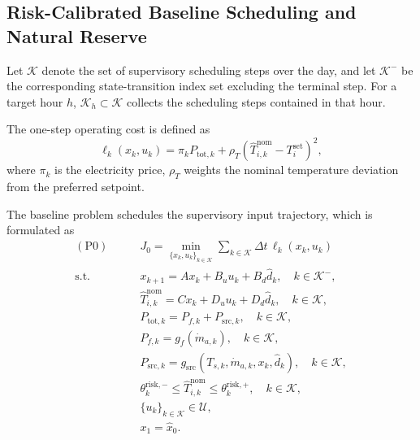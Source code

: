 \documentclass[journal]{IEEEtran}
\theoremstyle{remark}
\begin{document}
\subsection{Risk-Calibrated Baseline Scheduling and Natural Reserve}
\label{subsec:baseline_natural_reserve}

Let \(\mathcal{K}\) denote the set of supervisory scheduling steps over
the day, and let \(\mathcal{K}^{-}\) be the corresponding
state-transition index set excluding the terminal step. For a target
hour \(h\), \(\mathcal{K}_h\subset\mathcal{K}\) collects the scheduling
steps contained in that hour.

The one-step operating cost is defined as
\begin{equation}
	\ell_k(x_k,u_k)
	=
	\pi_k P_{\mathrm{tot},k}
	+
	\rho_T
	\left(
	\hat T_{i,k}^{\mathrm{nom}}-T_i^{\mathrm{set}}
	\right)^2 ,
	\label{eq:stage_cost}
\end{equation}
where \(\pi_k\) is the electricity price, \(\rho_T\) weights the nominal temperature deviation from the preferred setpoint.

The baseline problem schedules the supervisory input trajectory, which is formulated as
\begin{subequations}
	\label{prob:P0}
	\begin{align}
		(\mathrm{P0})\qquad
		&J_0=
		\min_{\{x_k,u_k\}_{k\in\mathcal{K}}}
		\sum_{k\in\mathcal{K}}
		\Delta t\,\ell_k(x_k,u_k)
		\label{eq:p0_obj}
		\\
		\mathrm{s.t.}\qquad
		&
		x_{k+1}
		=
		A x_k+B_u u_k+B_d\hat d_k,
		\quad k\in\mathcal{K}^{-},
		\label{eq:p0_dyn}
		\\
		&
		\hat T_{i,k}^{\mathrm{nom}}
		=
		C x_k+D_u u_k+D_d\hat d_k,
		\quad k\in\mathcal{K},
		\label{eq:p0_temp}
		\\
		&
		P_{\mathrm{tot},k}
		=
		P_{f,k}+P_{\mathrm{src},k},
		\quad k\in\mathcal{K},
		\label{eq:p0_total_power}
		\\
		&
		P_{f,k}
		=
		g_f(\dot m_{a,k}),
		\quad k\in\mathcal{K},
		\label{eq:p0_fan_power}
		\\
		&
		P_{\mathrm{src},k}
		=
		g_{\mathrm{src}}
		(T_{s,k},\dot m_{a,k},x_k,\hat d_k),
		\quad k\in\mathcal{K},
		\label{eq:p0_src_power}
		\\
		&
		\theta_{k}^{\mathrm{risk},-}
		\le
		\hat T_{i,k}^{\mathrm{nom}}
		\le
		\theta_{k}^{\mathrm{risk},+},
		\quad k\in\mathcal{K},
		\label{eq:p0_risk_comfort}
		\\
		&
		\{u_k\}_{k\in\mathcal{K}}\in\mathcal{U},
		\label{eq:p0_control_set}
		\\
		&
		x_1=\hat x_0 .
		\label{eq:p0_initial}
	\end{align}
\end{subequations}
\end{document}
